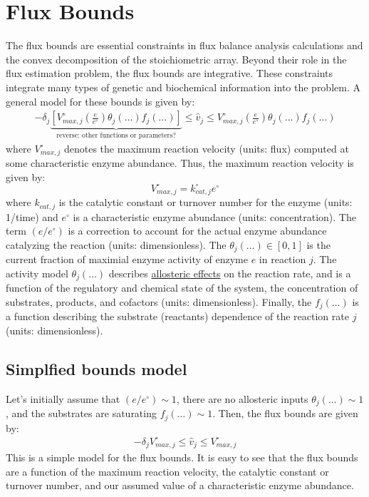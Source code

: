 \documentclass{article}[11pt]
\begin{document}
\section{Flux Bounds}\label{sec-flux-bounds}
The flux bounds are essential constraints in flux balance analysis calculations and the convex decomposition of the stoichiometric array. 
Beyond their role in the flux estimation problem, the flux bounds are integrative. These constraints integrate many types of genetic and biochemical information into the problem. 
A general model for these bounds is given by:
\begin{align*}
-\delta_{j}\underbrace{\left[{V_{max,j}^{\circ}}\left(\frac{e}{e^{\circ}}\right)\theta_{j}\left(\dots\right){f_{j}\left(\dots\right)}\right]}_{\text{reverse: other functions or parameters?}}\leq\hat{v}_{j}\leq{V_{max,j}^{\circ}}\left(\frac{e}{e^{\circ}}\right)\theta_{j}\left(\dots\right){f_{j}\left(\dots\right)}
\end{align*}
where $V_{max,j}^{\circ}$ denotes the maximum reaction velocity (units: flux) computed at some characteristic enzyme abundance. 
Thus, the maximum reaction velocity is given by:
\begin{equation*}
V_{max,j}^{\circ} = k_{cat,j}^{\circ}e^{\circ}
\end{equation*}
where $k_{cat,j}$ is the catalytic constant or turnover number for the enzyme (units: 1/time) and $e^{\circ}$ is a characteristic enzyme abundance (units: concentration). 
The term $\left(e/e^{\circ}\right)$ is a correction to account for the actual enzyme abundance catalyzing the reaction (units: dimensionless). 
The $\theta_{j}\left(\dots\right)\in\left[0,1\right]$ is the current fraction of maximial enzyme activity of enzyme $e$ in reaction $j$. 
The activity model $\theta_{j}\left(\dots\right)$ describes \href{https://en.wikipedia.org/wiki/Allosteric_regulation}{allosteric effects} on the reaction rate, 
and is a function of the regulatory and chemical state of the system, the concentration of substrates, products, and cofactors (units: dimensionless).
Finally, the $f_{j}\left(\dots\right)$ is a function describing the substrate (reactants) dependence of the reaction rate $j$ (units: dimensionless). 

\subsection{Simplfied bounds model}
Let's initially assume that $(e/e^{\circ})\sim{1}$, there are no allosteric inputs $\theta_{j}\left(\dots\right)\sim{1}$, and the substrates are saturating $f_{j}\left(\dots\right)\sim{1}$. 
Then, the flux bounds are given by:
\begin{align*}
-\delta_{j}V_{max,j}^{\circ}\leq{\hat{v}_{j}}\leq{V_{max,j}^{\circ}}
\end{align*}
This is a simple model for the flux bounds. 
It is easy to see that the flux bounds are a function of the maximum reaction velocity, the catalytic constant or turnover number, and our assumed value of a characteristic enzyme abundance.
\end{document}
